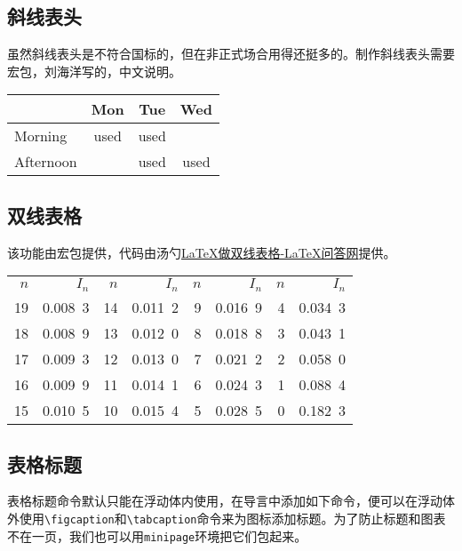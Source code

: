 \subsection{斜线表头}

虽然斜线表头是不符合国标的，但在非正式场合用得还挺多的。制作斜线表头需要宏包，刘海洋写的，中文说明。

\begin{codeshow}
\centering
\begin{tabular}{|l|ccc|}
    \hline
    \diagbox{Time}{Room}{Day}
        &Mon&Tue&Wed\\
    \hline
    Morning&used&used&\\
    Afternoon& &used&used\\
    \hline
\end{tabular}
\end{codeshow}

\subsection{双线表格}
该功能由宏包提供，代码由汤勺\href{http://wenda.latexstudio.net/article/1012}{\LaTeX{}做双线表格-\LaTeX{}问答网}提供。

\begin{codeshow}
\begin{tabular}{r|r||r|r||r|r||r|r}\hline
    $n$&$I_n$&$n$&$I_n$&$n$&$I_n$&$n$&$I_n$\\\hhline{--||--||--||--}
    19&0.008\ 3&14&0.011\ 2&9&0.016\ 9&4&0.034\ 3\\
    18&0.008\ 9&13&0.012\ 0&8&0.018\ 8&3&0.043\ 1\\
    17&0.009\ 3&12&0.013\ 0&7&0.021\ 2&2&0.058\ 0\\
    16&0.009\ 9&11&0.014\ 1&6&0.024\ 3&1&0.088\ 4\\
    15&0.010\ 5&10&0.015\ 4&5&0.028\ 5&0&0.182\ 3\\\hline
\end{tabular}
\end{codeshow}


\subsection{表格标题}

表格标题命令默认只能在浮动体内使用，在导言中添加如下命令，便可以在浮动体外使用\verb|\figcaption|和\verb|\tabcaption|命令来为图标添加标题。为了防止标题和图表不在一页，我们也可以用\verb|minipage|环境把它们包起来。

